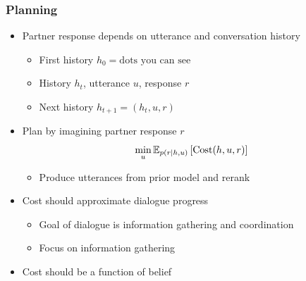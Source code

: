 \documentclass{beamer}
\begin{document}
\begin{frame}
\frametitle{Planning}
\begin{itemize}
\item Partner response depends on utterance and conversation history
    \begin{itemize}
    \item First history $h_0 = \text{dots you can see}$
    \item History $h_t$, utterance $u$, response $r$
    \item Next history $h_{t+1} = (h_t, u, r)$
    \end{itemize}
\begin{center}
\end{center}
\item Plan by imagining partner response $r$
$$\min_{u} \mathbb{E}_{p(r \mid h, u)}\left[\text{Cost}(h, u, r)\right]$$
    \begin{itemize}
    \item Produce utterances from prior model and rerank
    \end{itemize}
\item Cost should approximate dialogue progress
    \begin{itemize}
    \item Goal of dialogue is information gathering and coordination
    \item Focus on information gathering
    \end{itemize}
\item Cost should be a function of belief
\end{itemize}
\end{frame}
\end{document}
